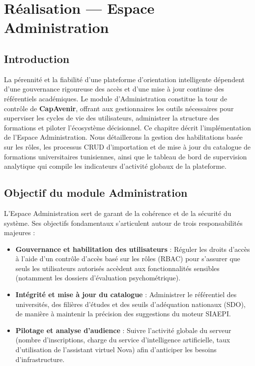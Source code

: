 
\chapter{Réalisation — Espace Administration}
\label{chap:realisation_administration}

\section*{Introduction}

La pérennité et la fiabilité d'une plateforme d'orientation intelligente dépendent d'une gouvernance rigoureuse des accès et d'une mise à jour continue des référentiels académiques. Le module d'Administration constitue la tour de contrôle de \textbf{CapAvenir}, offrant aux gestionnaires les outils nécessaires pour superviser les cycles de vie des utilisateurs, administrer la structure des formations et piloter l'écosystème décisionnel. Ce chapitre décrit l'implémentation de l'Espace Administration. Nous détaillerons la gestion des habilitations basée sur les rôles, les processus CRUD d'importation et de mise à jour du catalogue de formations universitaires tunisiennes, ainsi que le tableau de bord de supervision analytique qui compile les indicateurs d'activité globaux de la plateforme.

\section{Objectif du module Administration}

L'Espace Administration sert de garant de la cohérence et de la sécurité du système. Ses objectifs fondamentaux s'articulent autour de trois responsabilités majeures :
\begin{itemize}
    \item \textbf{Gouvernance et habilitation des utilisateurs} : Réguler les droits d'accès à l'aide d'un contrôle d'accès basé sur les rôles (RBAC) pour s'assurer que seuls les utilisateurs autorisés accèdent aux fonctionnalités sensibles (notamment les dossiers d'évaluation psychométrique).
    \item \textbf{Intégrité et mise à jour du catalogue} : Administrer le référentiel des universités, des filières d'études et des seuils d'adéquation nationaux (SDO), de manière à maintenir la précision des suggestions du moteur SIAEPI.
    \item \textbf{Pilotage et analyse d'audience} : Suivre l'activité globale du serveur (nombre d'inscriptions, charge du service d'intelligence artificielle, taux d'utilisation de l'assistant virtuel Nova) afin d'anticiper les besoins d'infrastructure.
\end{itemize}

